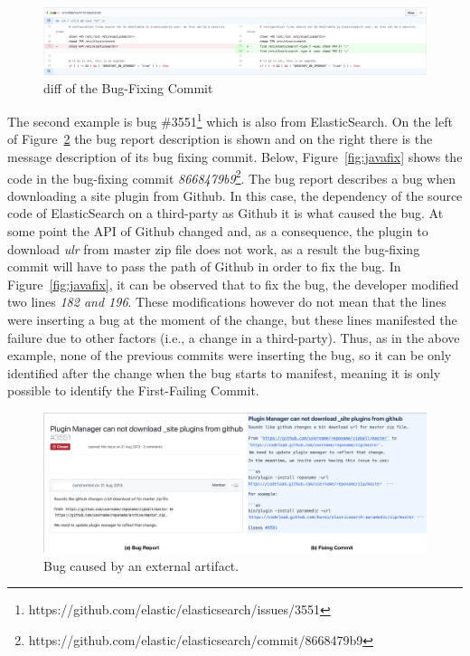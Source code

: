 \documentclass[a4paper, 12pt]{book}
\begin{document}
\begin{figure}[ht]
\centering
\includegraphics[width=\columnwidth]{img/subdirectoriesfix.png}
\caption{diff of the Bug-Fixing Commit}
\label{fig:subdirectoriesfix}       %
\end{figure}


The second example is bug \#3551\footnote{https://github.com/elastic/elasticsearch/issues/3551} which is also from ElasticSearch. On the left of Figure~\ref{fig:java} the bug report description is shown and on the right there is the message description of its bug fixing commit. Below, Figure~\ref{fig:javafix} shows the code in the bug-fixing commit \emph{8668479b9}\footnote{https://github.com/elastic/elasticsearch/commit/8668479b9}. The bug report describes a bug when downloading a site plugin from Github. In this case, the dependency of the source code of ElasticSearch on a third-party as Github it is what caused the bug. At some point the API of Github changed and, as a consequence, the plugin to download \emph{ulr} from master zip file does not work, as a result the bug-fixing commit will have to pass the path of Github in order to fix the bug. In Figure~\ref{fig:javafix}, it can be observed that to fix the bug, the developer modified two lines \emph{182 and 196}. These modifications however do not mean that the lines were inserting a bug at the moment of the change, but  these lines manifested the failure due to other factors (i.e., a change in a third-party). Thus, as in the above example, none of the previous commits were inserting the bug, so it can be only identified after the change when the bug starts to manifest, meaning it is only possible to identify the First-Failing Commit.
\begin{figure}[ht]
\centering
\includegraphics[width=\columnwidth]{img/github.png}
\caption{Bug caused by an external artifact.}
\label{fig:java}       %
\end{figure}
\end{document}
